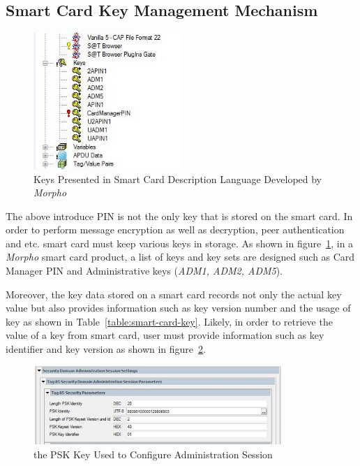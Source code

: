 \subsection{Smart Card Key Management Mechanism} \label{labelKeyManagement}

 \begin{figure}[!htb]
	\centering
	\includegraphics[width=0.5\textwidth]{smart-card-key.jpg}
		\caption{Keys Presented in Smart Card Description Language Developed by \emph{Morpho}}
	\label{fig:smart-card-key}
\end{figure}

The above introduce PIN is not the only key that is stored on the smart card. In order to perform message encryption as well as decryption, peer authentication and etc. smart card must keep various keys in storage. As shown in figure~\ref{fig:smart-card-key}, in a \emph{Morpho} smart card product, a list of keys and key sets are designed such as Card Manager PIN and Administrative keys (\emph{ADM1, ADM2, ADM5}).

Moreover, the key data stored on a  smart card records not only the actual key value but also provides information such as key version number and the usage of key as shown in Table~\ref{table:smart-card-key}. Likely, in order to retrieve the value of a key from smart card, user must provide information such as key identifier and key version as shown in figure~\ref{fig:smart-card-key-use}.

 \begin{figure}[!htb]
	\centering
	\includegraphics[width=0.85\textwidth]{smart-card-key-use.jpg}
		\caption{the PSK Key Used to Configure Administration Session}
	\label{fig:smart-card-key-use}
\end{figure}

